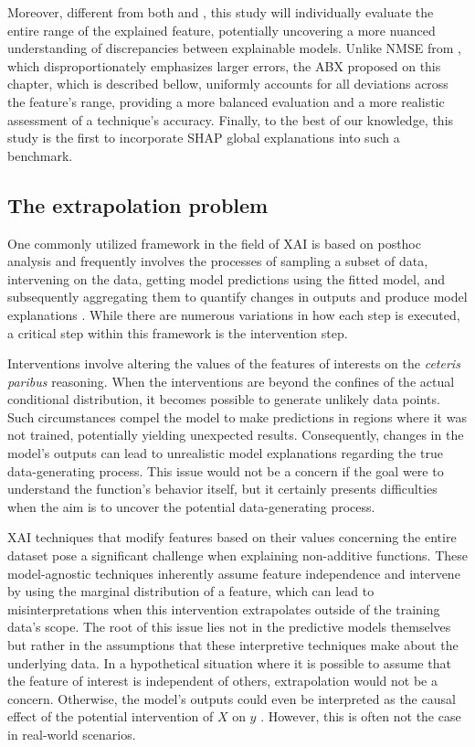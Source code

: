 Moreover, different from both \cite{Molnar2023Model-agnosticApproach} and \cite{Gkolemis2022DALE:Explanations}, this study will individually evaluate the entire range of the explained feature, potentially uncovering a more nuanced understanding of discrepancies between explainable models. Unlike \gls{NMSE} from \cite{Gkolemis2022DALE:Explanations}, which disproportionately emphasizes larger errors, the \gls{ABX} proposed on this chapter, which is described bellow, uniformly accounts for all deviations across the feature's range, providing a more balanced evaluation and a more realistic assessment of a technique's accuracy. Finally, to the best of our knowledge, this study is the first to incorporate \gls{SHAP} global explanations into such a benchmark.


\subsection{The extrapolation problem}

One commonly utilized framework in the field of \gls{XAI} is based on post\-hoc analysis and frequently involves the processes of sampling a subset of data, intervening on the data, getting model predictions using the fitted model, and subsequently aggregating them to quantify changes in outputs and produce model explanations \cite{Scholbeck2020SamplingInterpretations}. While there are numerous variations in how each step is executed, a critical step within this framework is the intervention step.

Interventions involve altering the values of the features of interests on the \textit{ceteris paribus} reasoning. When the interventions are beyond the confines of the actual conditional distribution, it becomes possible to generate unlikely data points. Such circumstances compel the model to make predictions in regions where it was not trained, potentially yielding unexpected results. Consequently, changes in the model's outputs can lead to unrealistic model explanations regarding the true data-generating process. This issue would not be a concern if the goal were to understand the function's behavior itself, but it certainly presents difficulties when the aim is to uncover the potential data-generating process.

\gls{XAI}  techniques that modify features based on their values concerning the entire dataset pose a significant challenge when explaining non-additive functions. These model-agnostic techniques inherently assume feature independence and intervene by using the marginal distribution of a feature, which can lead to misinterpretations when this intervention extrapolates outside of the training data's scope. The root of this issue lies not in the predictive models themselves but rather in the assumptions that these interpretive techniques make about the underlying data. In a hypothetical situation where it is possible to assume that the feature of interest is independent of others, extrapolation would not be a concern. Otherwise, the model's outputs could even be interpreted as the causal effect of the potential intervention of \(X\) on \(y\) \cite{Zhao2021CausalModels}. However, this is often not the case in real-world scenarios. 

